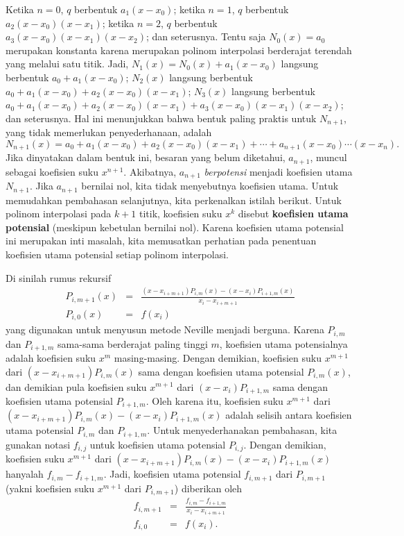 Ketika $n=0$, $q$ berbentuk $a_{1}(x-x_{0})$; ketika $n=1$, $q$
berbentuk $a_{2}(x-x_{0})(x-x_{1})$; ketika $n=2$, $q$ berbentuk
$a_{3}(x-x_{0})(x-x_{1})(x-x_{2})$; dan seterusnya. Tentu saja $N_{0}(x)=a_{0}$
merupakan konstanta karena merupakan polinom interpolasi berderajat
terendah yang melalui satu titik. Jadi, $N_{1}(x)=N_{0}(x)+a_{1}(x-x_{0})$
langsung berbentuk $a_{0}+a_{1}(x-x_{0})$; $N_{2}(x)$ langsung berbentuk
$a_{0}+a_{1}(x-x_{0})+a_{2}(x-x_{0})(x-x_{1})$; $N_{3}(x)$ langsung
berbentuk $a_{0}+a_{1}(x-x_{0})+a_{2}(x-x_{0})(x-x_{1})+a_{3}(x-x_{0})(x-x_{1})(x-x_{2})$;
dan seterusnya. Hal ini menunjukkan bahwa bentuk paling praktis untuk
$N_{n+1}$, yang tidak memerlukan penyederhanaan, adalah
\begin{equation}
N_{n+1}(x)=a_{0}+a_{1}(x-x_{0})+a_{2}(x-x_{0})(x-x_{1})+\cdots+a_{n+1}(x-x_{0})\cdots(x-x_{n}).\label{eq:NewtonForm}
\end{equation}
Jika dinyatakan dalam bentuk ini, besaran yang belum diketahui, $a_{n+1}$,
muncul sebagai koefisien suku $x^{n+1}$. Akibatnya, $a_{n+1}$ \textit{berpotensi}
menjadi koefisien utama $N_{n+1}$. Jika $a_{n+1}$ bernilai nol,
kita tidak menyebutnya koefisien utama. Untuk memudahkan pembahasan
selanjutnya, kita perkenalkan istilah berikut. Untuk polinom interpolasi
pada $k+1$ titik, koefisien suku $x^{k}$ disebut \textbf{koefisien
utama potensial }(meskipun kebetulan
bernilai nol). Karena koefisien utama potensial ini merupakan inti
masalah, kita memusatkan perhatian pada penentuan koefisien utama
potensial setiap polinom interpolasi.

Di sinilah rumus rekursif
\begin{eqnarray*}
P_{i,m+1}(x) & = & \frac{(x-x_{i+m+1})P_{i,m}(x)-(x-x_{i})P_{i+1,m}(x)}{x_{i}-x_{i+m+1}}\\
P_{i,0}(x) & = & f(x_{i})
\end{eqnarray*}
yang digunakan untuk menyusun metode Neville menjadi berguna. Karena
$P_{i,m}$ dan $P_{i+1,m}$ sama-sama berderajat paling tinggi $m$,
koefisien utama potensialnya adalah koefisien suku $x^{m}$ masing-masing.
Dengan demikian, koefisien suku $x^{m+1}$ dari $(x-x_{i+m+1})P_{i,m}(x)$
sama dengan koefisien utama potensial $P_{i,m}(x)$, dan demikian
pula koefisien suku $x^{m+1}$ dari $(x-x_{i})P_{i+1,m}$ sama dengan
koefisien utama potensial $P_{i+1,m}$. Oleh karena itu, koefisien
suku $x^{m+1}$ dari $(x-x_{i+m+1})P_{i,m}(x)-(x-x_{i})P_{i+1,m}(x)$
adalah selisih antara koefisien utama potensial $P_{i,m}$ dan $P_{i+1,m}$.
Untuk menyederhanakan pembahasan, kita gunakan notasi $f_{i,j}$ untuk
koefisien utama potensial $P_{i,j}$. Dengan demikian, koefisien suku
$x^{m+1}$ dari $(x-x_{i+m+1})P_{i,m}(x)-(x-x_{i})P_{i+1,m}(x)$ hanyalah
$f_{i,m}-f_{i+1,m}$. Jadi, koefisien utama potensial $f_{i,m+1}$
dari $P_{i,m+1}$ (yakni koefisien suku $x^{m+1}$ dari $P_{i,m+1}$)
diberikan oleh
\begin{eqnarray}
f_{i,m+1} & = & \frac{f_{i,m}-f_{i+1,m}}{x_{i}-x_{i+m+1}}\label{eq:newtonRecursion}\\
f_{i,0} & = & f(x_{i}).\nonumber 
\end{eqnarray}


